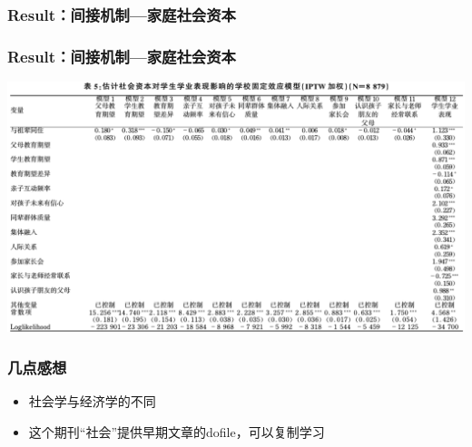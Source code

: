 \documentclass{beamer}
\begin{document}
\begin{frame}
	\frametitle{Result：间接机制---家庭社会资本}

\end{frame}


\begin{frame}
	\frametitle{Result：间接机制---家庭社会资本}
\includegraphics[scale=0.32]{table5}
\end{frame}


\begin{frame}
	\frametitle{几点感想}
	\begin{itemize}
		\item 社会学与经济学的不同
		\item 这个期刊“社会”提供早期文章的dofile，可以复制学习
	\end{itemize}
\end{frame}
\end{document}
